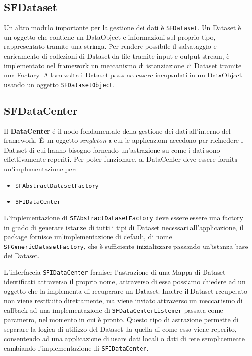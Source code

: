 \subsection{SFDataset}
\label{sub:sfdataset}
Un altro modulo importante per la gestione dei dati \`e \texttt{SFDataset}. Un Dataset \`e un oggetto che contiene un DataObject e informazioni sul proprio tipo, rappresentato tramite una stringa. Per rendere possibile il salvataggio e caricamento di collezioni di Dataset da file tramite input e output stream, \`e implementato nel framework un meccanismo di istanziazione di Dataset tramite una Factory.
A loro volta i Dataset possono essere incapsulati in un DataObject usando un oggetto \texttt{SFDatasetObject}.

\subsection{SFDataCenter}
\label{sub:sfdatacenter} 
Il \textbf{DataCenter} \'e il nodo fondamentale della gestione dei dati all'interno del framework. \'E un oggetto \textit{singleton} a cui le applicazioni accedono per richiedere i Dataset di cui hanno bisogno fornendo un'astrazione su come i dati sono effettivamente reperiti.
Per poter funzionare, al DataCenter deve essere fornita un'implementazione per:
\begin{itemize}
	\item \texttt{SFAbstractDatasetFactory}
	\item \texttt{SFIDataCenter}
\end{itemize}

L'implementazione di \texttt{SFAbstractDatasetFactory} deve essere essere una factory in grado di generare istanze di tutti i tipi di Dataset necessari all'applicazione, il package fornisce un'implementazione di default, di nome \texttt{SFGenericDatasetFactory}, che \`e sufficiente inizializzare passando un'istanza base dei Dataset.

L'interfaccia \texttt{SFIDataCenter} fornisce l'astrazione di una Mappa di Dataset identificati attraverso il proprio nome, attraverso di essa possiamo chiedere ad un oggetto che la implementa di recuperare un Dataset.
Inoltre il Dataset recuperato non viene restituito direttamente, ma viene inviato attraverso un meccanismo di callback ad una implementazione di \texttt{SFDataCenterListener} passata come parametro, nel momento in cui \`e pronto. 
Questo tipo di astrazione permette di separare la logica di utilizzo del Dataset da quella di come esso viene reperito, consentendo ad una applicazione di usare dati locali o dati di rete semplicemente cambiando l'implementazione di \texttt{SFIDataCenter}. 

